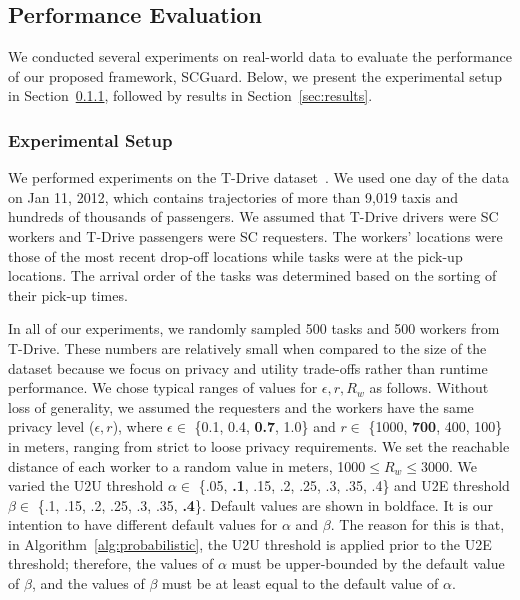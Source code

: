 \documentclass{USC-Thesis}
\newcommand{\SCG}{{SCGuard}}
\numberwithin{equation}{chapter}
\begin{document}
\subsection{Performance Evaluation}
\label{sec:evaluation}

We conducted several experiments on real-world data to evaluate the performance of our proposed framework, \SCG. Below, we present the experimental setup in Section~\ref{sec:methodology}, followed by results in Section~\ref {sec:results}.

\subsubsection{Experimental Setup}
\label{sec:methodology}
We performed experiments on the T-Drive dataset~\cite{yuan2010t}. We used one day of the data on Jan 11, 2012, which contains trajectories of more than 9,019 taxis and hundreds of thousands of passengers. We assumed that T-Drive drivers were SC workers and T-Drive passengers were SC requesters. The workers' locations were those of the most recent drop-off locations while tasks were at the pick-up locations. The arrival order of the tasks was determined based on the sorting of their pick-up times.

In all of our experiments, we randomly sampled 500 tasks and 500 workers from T-Drive. These numbers are relatively small when compared to the size of the dataset because we focus on privacy and utility trade-offs rather than runtime performance.
We chose typical ranges of values for $\epsilon,r,R_w$ as follows. Without loss of generality, we assumed the requesters and the workers have the same privacy level ($\epsilon,r$), where $\epsilon \in$ \{0.1, 0.4, \textbf{0.7}, 1.0\} and $r \in$ \{1000, \textbf{700}, 400, 100\} in meters, ranging from strict to loose privacy requirements.
We set the reachable distance of each worker to a random value in meters, 1000$\le R_w\le$3000.
We varied the U2U threshold $\alpha \in$ \{.05, \textbf{.1}, .15, .2, .25, .3, .35, .4\} and U2E threshold $\beta \in$ \{.1, .15, .2, .25, .3, .35, \textbf{.4}\}.
Default values are shown in boldface. It is our intention to have different default values for $\alpha$ and $\beta$. The reason for this is that, in Algorithm~\ref{alg:probabilistic}, the U2U threshold is applied prior to the U2E threshold; therefore, the values of $\alpha$ must be upper-bounded by the default value of $\beta$, and the values of $\beta$ must be at least equal to the default value of $\alpha$.
\end{document}
